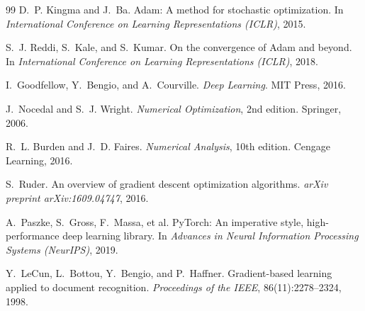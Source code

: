 \documentclass[12pt,a4paper]{ctexart}
\begin{document}
\begin{thebibliography}{99}
\small
{}
D.~P. Kingma and J.~Ba.
\newblock Adam: A method for stochastic optimization.
\newblock In \emph{International Conference on Learning Representations (ICLR)}, 2015.

S.~J. Reddi, S.~Kale, and S.~Kumar.
\newblock On the convergence of Adam and beyond.
\newblock In \emph{International Conference on Learning Representations (ICLR)}, 2018.

I.~Goodfellow, Y.~Bengio, and A.~Courville.
\newblock \emph{Deep Learning}.
\newblock MIT Press, 2016.

J.~Nocedal and S.~J. Wright.
\newblock \emph{Numerical Optimization}, 2nd edition.
\newblock Springer, 2006.

R.~L. Burden and J.~D. Faires.
\newblock \emph{Numerical Analysis}, 10th edition.
\newblock Cengage Learning, 2016.

S.~Ruder.
\newblock An overview of gradient descent optimization algorithms.
\newblock \emph{arXiv preprint arXiv:1609.04747}, 2016.

A.~Paszke, S.~Gross, F.~Massa, et al.
\newblock PyTorch: An imperative style, high-performance deep learning library.
\newblock In \emph{Advances in Neural Information Processing Systems (NeurIPS)}, 2019.

Y.~LeCun, L.~Bottou, Y.~Bengio, and P.~Haffner.
\newblock Gradient-based learning applied to document recognition.
\newblock \emph{Proceedings of the IEEE}, 86(11):2278--2324, 1998.
\end{thebibliography}
\end{document}
